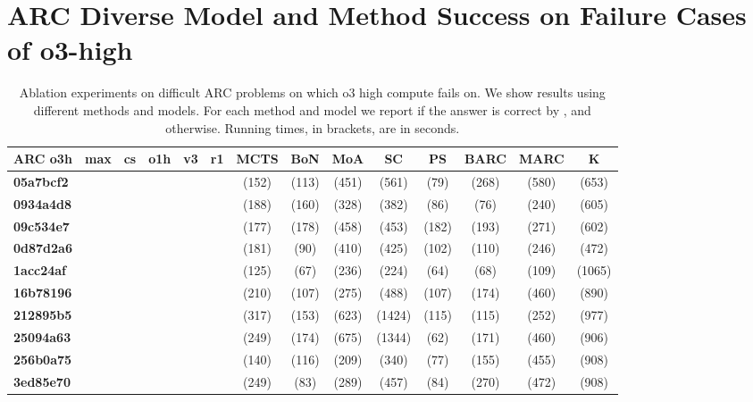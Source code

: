 \section{ARC Diverse Model and Method Success on Failure Cases of o3-high}
\label{appendix:P}

\begin{table*}[htb]
  \centering
  \tiny
  \caption{Ablation experiments on difficult ARC problems on which o3 high compute fails on. We show results using different methods and models. For each method and model we report if the answer is correct by \C, and \X otherwise. Running times, in brackets, are in seconds.}
\begin{tabular}{l|c|cccc|ccccc|ccc}
\toprule
{\bf ARC o3h \X} &  {\bf max}& {\bf cs} & {\bf o1h} & \bf{v3} &\bf{r1} & {\bf MCTS} & {\bf BoN} & {\bf MoA} & {\bf SC} & {\bf PS} &{\bf BARC} &{\bf MARC} & {\bf K}\\
\midrule
\textbf{05a7bcf2} & \X  & \X  & \X & \X  & \X  & \X (152) & \X (113) & \X (451) & \X (561) & \X (79) & \X (268)& \X (580) & \X (653)\\
\midrule
\textbf{0934a4d8} & \X  & \X  & \X & \X  & \X  &  \X (188) & \X (160) & \X (328) & \X (382) & \X (86) & \X (76)& \X (240)& \X (605)\\
\midrule
\textbf{09c534e7} & \X  & \X  & \X & \X  & \X  & \X (177) & \X (178) & \X (458) & \X (453) & \X (182) & \X (193)& \X (271)& \X (602)\\
\midrule
\textbf{0d87d2a6} & \C & \X  & \X & \X  & \X  & \X (181) & \X (90) & \X (410) & \X (425) & \X (102) & \C (110)& \X (246)& \X (472)\\
\midrule
\textbf{1acc24af} & \X  & \X  & \X & \X  & \X  & \X (125) & \X (67) & \X (236) & \X (224) & \X (64) & \X (68)& \X (109)& \X (1065)\\
\midrule
\textbf{16b78196} & \X  & \X  & \X & \X  & \X & \X (210) & \X (107) & \X (275) & \X (488) & \X (107) & \X (174)& \X (460)& \X (890)\\
\midrule
\textbf{212895b5} & \X  & \X & \X & \X  & \X & \X (317) & \X (153) & \X (623) & \X (1424) & \X (115) & \X (115) & \X (252) & \X (977)\\
\midrule
\textbf{25094a63} & \X  & \X & \X & \X  & \X & \X (249) & \X (174) & \X (675) & \X (1344) & \X (62) & \X (171)& \X (460)& \X (906)\\
\midrule
\textbf{256b0a75} & \X  & \X & \X & \X  & \X & \X (140) & \X (116) & \X (209) & \X (340) & \X (77) & \X (155)& \X (455)& \X (908)\\
\midrule
\textbf{3ed85e70} & \X  & \X  & \X & \X  & \X  & \X (249) & \X (83) & \X (289) & \X (457) & \X (84)  & \X (270)& \X (472)& \X (908)\\

\end{tabular}
\end{table*}
